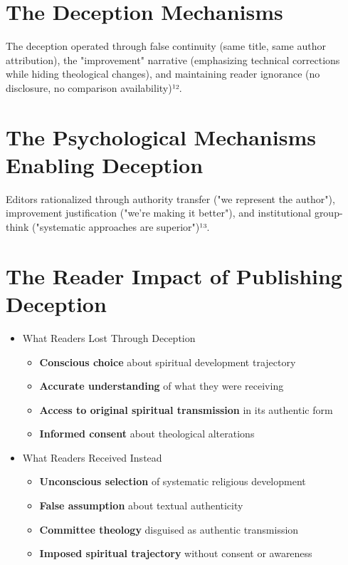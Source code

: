 \documentclass[11pt,twoside]{book}
\begin{document}
\section*{The Deception Mechanisms}
\label{sec:org6f26f56}

The deception operated through false continuity (same title, same author attribution), the "improvement" narrative (emphasizing technical corrections while hiding theological changes), and maintaining reader ignorance (no disclosure, no comparison availability)¹².
\section*{The Psychological Mechanisms Enabling Deception}
\label{sec:orga393b31}

Editors rationalized through authority transfer ("we represent the author"), improvement justification ("we're making it better"), and institutional group-think ("systematic approaches are superior")¹³.
\section*{The Reader Impact of Publishing Deception}
\label{sec:orgf00bb96}

\begin{itemize}
\item What Readers Lost Through Deception
\label{sec:org4b3c630}
\begin{itemize}
\item \textbf{\textbf{Conscious choice}} about spiritual development trajectory
\item \textbf{\textbf{Accurate understanding}} of what they were receiving
\item \textbf{\textbf{Access to original spiritual transmission}} in its authentic form
\item \textbf{\textbf{Informed consent}} about theological alterations
\end{itemize}
\item What Readers Received Instead
\label{sec:org5daae23}
\begin{itemize}
\item \textbf{\textbf{Unconscious selection}} of systematic religious development
\item \textbf{\textbf{False assumption}} about textual authenticity
\item \textbf{\textbf{Committee theology}} disguised as authentic transmission
\item \textbf{\textbf{Imposed spiritual trajectory}} without consent or awareness
\end{itemize}
\end{itemize}
\end{document}
